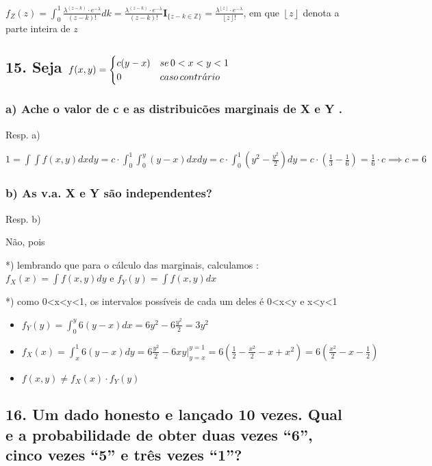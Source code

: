 \documentclass[portuguese]{article}
\begin{document}
$f_{Z}(z)=\int_{0}^{1}\frac{\lambda^{(z-k)}\cdot e^{-\lambda}}{(z-k)!}dk=\frac{\lambda^{(z-k)}\cdot e^{-\lambda}}{(z-k)!}\mathbf{I}_{\{z-k\in\mathbb{Z}\}}=\frac{\lambda^{\left\lfloor z\right\rfloor }\cdot e^{-\lambda}}{\left\lfloor z\right\rfloor !}$,
em que $\left\lfloor z\right\rfloor $ denota a parte inteira de $z$


\subsection*{\textmd{15. Seja $f(x,y)=\protect\begin{cases}
c(y-x) & se\,0<x<y<1\protect\\
0 & caso\, contr\acute{a}rio
\protect\end{cases}$}}


\subsubsection*{\textmd{a) Ache o valor de c e as distribuicões marginais de X e
Y . }}

Resp. a)

$1=\int\int f(x,y)dxdy=c\cdot\int_{0}^{1}\int_{0}^{y}(y-x)dxdy=c\cdot\int_{0}^{1}(y^{2}-\frac{y^{2}}{2})dy=c\cdot(\frac{1}{3}-\frac{1}{6})=\frac{1}{6}\cdot c\implies c=6$


\subsubsection*{\textmd{b) As v.a. X e Y são independentes? }}

Resp. b)

Não, pois 

{*}) lembrando que para o cálculo das marginais, calculamos : $f_{X}(x)=\int f(x,y)dy$
e $f_{Y}(y)=\int f(x,y)dx$

{*}) como 0<x<y<1, os intervalos possíveis de cada um deles é 0<x<y
e x<y<1
\begin{itemize}
\item $f_{Y}(y)=\int_{0}^{y}6(y-x)dx=6y^{2}-6\frac{y^{2}}{2}=3y^{2}$
\item $f_{X}(x)=\int_{x}^{1}6(y-x)dy=6\frac{y^{2}}{2}-6xy|_{y=x}^{y=1}=6(\frac{1}{2}-\frac{x^{2}}{2}-x+x^{2})=6(\frac{x^{2}}{2}-x-\frac{1}{2})$
\item $f(x,y)\neq f_{X}(x)\cdot f_{Y}(y)$
\end{itemize}

\subsection*{\textmd{16. Um dado honesto e lançado 10 vezes. Qual e a probabilidade
de obter duas vezes ``6'', cinco vezes ``5'' e três vezes ``1''?}}
\end{document}
